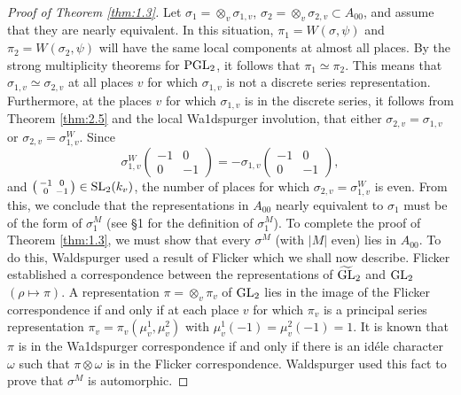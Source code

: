 \begin{proof}[Proof of Theorem \ref{thm:1.3}]
Let $\sigma_1 = \otimes_v \sigma_{1, v}$, $\sigma_2 = \otimes_v \sigma_{2, v} \subset A_{00}$, and assume that they are nearly equivalent.
In this situation, $\pi_1 = W(\sigma, \psi)$ and $\pi_2 = W(\sigma_2, \psi)$ will have the same local components at almost all places.
By the strong multiplicity theorems for $\mathrm{PGL}_2$, it follows that $\pi_1 \simeq \pi_2$.
This means that $\sigma_{1, v} \simeq \sigma_{2, v}$ at all places $v$ for which $\sigma_{1, v}$ is not a discrete series representation.
Furthermore, at the places $v$ for which $\sigma_{1, v}$ is in the discrete series, it follows from Theorem \ref{thm:2.5} and the local Wa1dspurger involution, that either $\sigma_{2, v} = \sigma_{1, v}$ or $\sigma_{2, v} = \sigma_{1, v}^W$.
Since
\[
\sigma_{1, v}^W \begin{pmatrix}
    -1 & 0 \\ 0 & -1
\end{pmatrix} = -\sigma_{1, v}\begin{pmatrix}
    -1 & 0 \\ 0 & -1
\end{pmatrix},
\]
and $\left(\begin{smallmatrix}
    -1 & 0\\0&-1
\end{smallmatrix}\right) \in \mathrm{SL}_2(k_v)$, the number of places for which $\sigma_{2, v} = \sigma_{1, v}^{W}$ is even.
From this, we conclude that the representations in $A_{00}$ nearly equivalent to $\sigma_1$ must be of the form of $\sigma_1^M$ (see \S 1 for the definition of $\sigma_1^M$).
To complete the proof of Theorem \ref{thm:1.3}, we must show that every $\sigma^M$ (with $|M|$ even) lies in $A_{00}$.
To do this, Waldspurger used a result of Flicker \cite{flicker80covering} which we shall now describe.
Flicker established a correspondence between the representations of $\widetilde{\mathrm{GL}}_2$ and $\mathrm{GL}_2$ $(\rho \mapsto \pi)$.
A representation $\pi = \otimes_v \pi_v$ of $\mathrm{GL}_2$ lies in the image of the Flicker correspondence if and only if at each place $v$ for which $\pi_v$ is a principal series representation $\pi_v = \pi_v(\mu_v^1, \mu_v^2)$ with $\mu_v^1(-1) = \mu_v^2(-1) = 1$.
It is known \cite{waldspurger91quaternion,gps81shimura} that $\pi$ is in the Wa1dspurger correspondence if and only if there is an id\'ele character $\omega$ such that $\pi \otimes \omega$ is in the Flicker correspondence.
Waldspurger used this fact to prove that $\sigma^M$ is automorphic.
\end{proof}